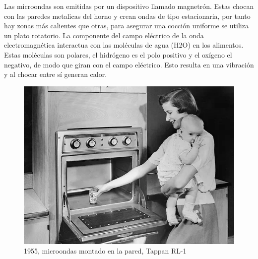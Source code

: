 Las microondas son emitidas por un dispositivo llamado magnetrón. Estas chocan con las paredes metalicas del horno y crean ondas de tipo estacionaria, por tanto hay zonas más calientes que otras, para asegurar una cocción uniforme se utiliza un plato rotatorio. La componente del campo eléctrico de la onda electromagnética interactua con las moléculas de agua (H2O) en los alimentos. Estas moléculas son polares, el hidrógeno es el polo positivo y el oxígeno el negativo, de modo que giran con el campo eléctrico. Esto resulta en una vibración y al chocar entre sí generan calor.

\begin{figure}[H]
  \centering
  \includegraphics[scale=0.5]{imagenes/microwave.png}
  \caption{1955, microondas montado en la pared, Tappan RL-1\cite{i3especmicrowave}}
\end{figure}
